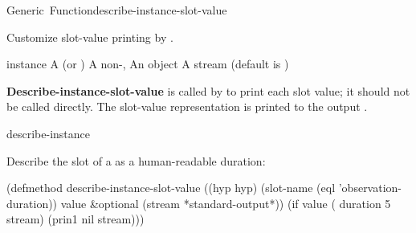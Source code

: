\documentclass[10pt,twoside,english,pdftex]{article}
\begin{document}

\begin{functiondoc}{Generic~Function}{describe-instance-slot-value}%
  {
    }
%
%
%

\fnsyntax

\fnpurpose Customize slot-value printing by
\textbf{}.

\fnmethods
{}%
  {\code{(} 
    }

\fnpackage {}

\fnmodule {}

%
\fnargs
\begin{args}{instance}
\arg[instance] A  (or )
 A non-\nil, 
\arg[value] An object
\arg[stream] A stream (default is )
\end{args}

\fndescription 
{}%
%
\textbf{Describe-instance-slot-value} is called by
 to print each slot value; it
should not be called directly. The slot-value representation is printed to the
output .

\begin{alsos}{describe-instance}
\end{alsos}

\fnexample
%
%  
%
Describe the  slot of a 
 as a human-readable duration:
%
\W\supp
\begin{example}
  (defmethod describe-instance-slot-value
      ((hyp hyp)
       (slot-name (eql 'observation-duration)) value
       \&optional (stream *standard-output*))
    (if value
        ( duration 5 stream)
        (prin1 nil stream)))
\end{example}

\end{functiondoc}
\end{document}
